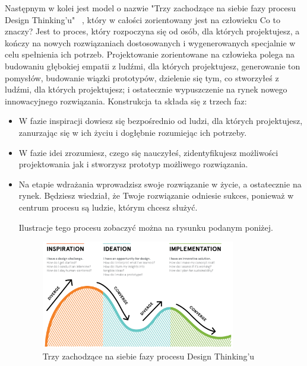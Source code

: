 \documentclass[a4paper,titleauthor]{mwart}
\begin{document}
Następnym w kolei jest model o nazwie "Trzy zachodzące na siebie fazy procesu Design Thinking'u" ~\cite{Proces2}, który w całości zorientowany jest na człowieku \newline \newline 
Co to znaczy? \newline \newline
Jest to proces, który rozpoczyna się od osób, dla których projektujesz, a kończy na nowych rozwiązaniach dostosowanych i wygenerowanych specjalnie w celu spełnienia ich potrzeb. Projektowanie zorientowane na człowieka polega na budowaniu głębokiej empatii z ludźmi, dla których projektujesz, generowanie ton pomysłów, budowanie wiązki prototypów, dzielenie się tym, co stworzyłeś z ludźmi, dla których projektujesz; i ostatecznie wypuszczenie na rynek nowego innowacyjnego rozwiązania. \newline \newline
Konstrukcja ta składa się z trzech faz:\newline
 \begin{itemize}
     \item W fazie inspiracji dowiesz się bezpośrednio od ludzi, dla których projektujesz, zanurzając się w ich życiu i dogłębnie rozumiejąc ich potrzeby. 
     \item W fazie idei zrozumiesz, czego się nauczyłeś, zidentyfikujesz możliwości projektowania jak i stworzysz prototyp możliwego rozwiązania. 
     \item Na etapie wdrażania wprowadzisz swoje rozwiązanie w życie, a ostatecznie na rynek. Będziesz wiedział, że Twoje rozwiązanie odniesie sukces, ponieważ w centrum procesu są ludzie, którym chcesz służyć.
     
     Ilustracje tego procesu zobaczyć można na rysunku podanym poniżej.
 
 \begin{figure}[h]
 	\centering
 	\includegraphics[width=0.8\textwidth]{2}
 	\caption{Trzy zachodzące na siebie fazy procesu Design Thinking'u}
 \end{figure}
 
\end{itemize}
\end{document}
